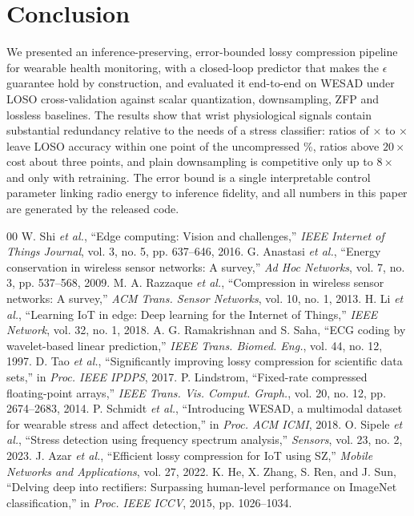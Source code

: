 \documentclass[conference]{IEEEtran}
\begin{document}
\section{Conclusion}
We presented an inference-preserving, error-bounded lossy compression pipeline for wearable health monitoring, with a closed-loop predictor that makes the $\epsilon$ guarantee hold by construction, and evaluated it end-to-end on WESAD under LOSO cross-validation against scalar quantization, downsampling, ZFP and lossless baselines. The results show that wrist physiological signals contain substantial redundancy relative to the needs of a stress classifier: ratios of \ratioEa$\times$ to \ratioEd$\times$ leave LOSO accuracy within one point of the uncompressed \rawAcc\%, ratios above $20\times$ cost about three points, and plain downsampling is competitive only up to $8\times$ and only with retraining. The error bound is a single interpretable control parameter linking radio energy to inference fidelity, and all numbers in this paper are generated by the released code.

\begin{thebibliography}{00}
 W. Shi \emph{et al.}, ``Edge computing: Vision and challenges,'' \emph{IEEE Internet of Things Journal}, vol. 3, no. 5, pp. 637--646, 2016.
 G. Anastasi \emph{et al.}, ``Energy conservation in wireless sensor networks: A survey,'' \emph{Ad Hoc Networks}, vol. 7, no. 3, pp. 537--568, 2009.
 M. A. Razzaque \emph{et al.}, ``Compression in wireless sensor networks: A survey,'' \emph{ACM Trans. Sensor Networks}, vol. 10, no. 1, 2013.
 H. Li \emph{et al.}, ``Learning IoT in edge: Deep learning for the Internet of Things,'' \emph{IEEE Network}, vol. 32, no. 1, 2018.
 A. G. Ramakrishnan and S. Saha, ``ECG coding by wavelet-based linear prediction,'' \emph{IEEE Trans. Biomed. Eng.}, vol. 44, no. 12, 1997.
 D. Tao \emph{et al.}, ``Significantly improving lossy compression for scientific data sets,'' in \emph{Proc. IEEE IPDPS}, 2017.
 P. Lindstrom, ``Fixed-rate compressed floating-point arrays,'' \emph{IEEE Trans. Vis. Comput. Graph.}, vol. 20, no. 12, pp. 2674--2683, 2014.
 P. Schmidt \emph{et al.}, ``Introducing WESAD, a multimodal dataset for wearable stress and affect detection,'' in \emph{Proc. ACM ICMI}, 2018.
 O. Sipele \emph{et al.}, ``Stress detection using frequency spectrum analysis,'' \emph{Sensors}, vol. 23, no. 2, 2023.
 J. Azar \emph{et al.}, ``Efficient lossy compression for IoT using SZ,'' \emph{Mobile Networks and Applications}, vol. 27, 2022.
 K. He, X. Zhang, S. Ren, and J. Sun, ``Delving deep into rectifiers: Surpassing human-level performance on ImageNet classification,'' in \emph{Proc. IEEE ICCV}, 2015, pp. 1026--1034.
\end{thebibliography}
\end{document}
